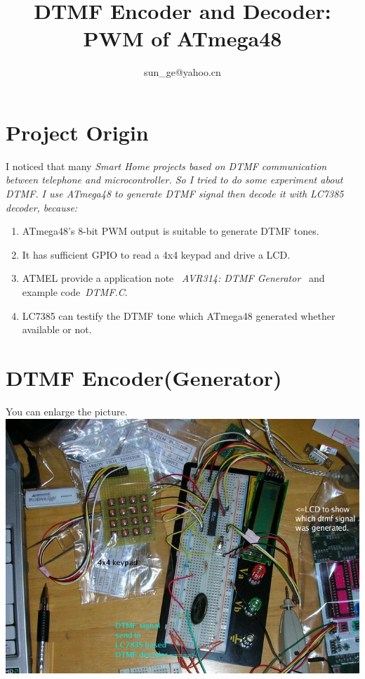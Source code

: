\documentclass[11pt,a4paper]{article}
\title{DTMF Encoder and Decoder: PWM of ATmega48}
\author{sun\_ge@yahoo.cn}
\begin{document}
\maketitle


\section{Project Origin}
I noticed that many \em{Smart Home} projects based on DTMF communication between telephone
and microcontroller. So I tried to do some experiment about DTMF.
I use ATmega48 to generate DTMF signal then decode it with LC7385 decoder, because:
\begin{enumerate}
\item ATmega48's 8-bit PWM output is suitable to generate DTMF tones.
\item It has sufficient GPIO to read a 4x4 keypad and drive a LCD.
\item ATMEL provide a application note ~\textit{AVR314: DTMF Generator}~ and
example code~\textit{DTMF.C}.
\item LC7385 can testify the DTMF tone which ATmega48 generated whether available or not.
\end{enumerate}

\section{DTMF Encoder(Generator)}
\begin{center}
You can enlarge the picture.\\
\includegraphics[scale=0.8]{dtmf-en.jpg}
\end{center}
\end{document}
